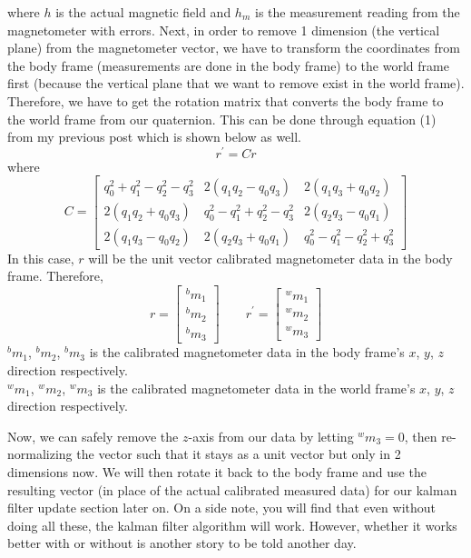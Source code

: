 \documentclass[a4paper,12pt]{book}
\begin{document}
where $h$ is the actual magnetic field and $h_m$ is the measurement reading from the magnetometer with errors. Next, in order to remove 1 dimension (the vertical plane) from the magnetometer vector, we have to transform the coordinates from the body frame (measurements are done in the body frame) to the world frame first (because the vertical plane that we want to remove exist in the world frame). Therefore, we have to get the rotation matrix that converts the body frame to the world frame from our quaternion. This can be done through equation (1) from my previous post which is shown below as well.
\begin{equation}
    r^\prime=Cr
\end{equation}
where
\begin{equation}
    C=\begin{bmatrix} q_0^2+q_1^2-q_2^2-q_3^2 & 2(q_1q_2-q_0q_3) & 2(q_1q_3+q_0q_2) \\ 2(q_1q_2+q_0q_3) & q_0^2-q_1^2+q_2^2-q_3^2 & 2(q_2q_3-q_0q_1) \\ 2(q_1q_3-q_0q_2) & 2(q_2q_3+q_0q_1) & q_0^2-q_1^2-q_2^2+q_3^2 \end{bmatrix}
\end{equation}
In this case, $r$ will be the unit vector calibrated magnetometer data in the body frame. Therefore,
\begin{equation}
   r = \begin{bmatrix} ^bm_1 \\ ^bm_2 \\ ^bm_3 \end{bmatrix} \qquad r^\prime = \begin{bmatrix} ^wm_1 \\ ^wm_2 \\ ^wm_3 \end{bmatrix}
\end{equation}
$^bm_1$, $^bm_2$, $^bm_3$  is the calibrated magnetometer data in the body frame’s $x$, $y$, $z$ direction respectively.\\

$^wm_1$, $^wm_2$, $^wm_3$ is the calibrated magnetometer data in the world frame’s $x$, $y$, $z$ direction respectively.

Now, we can safely remove the $z$-axis from our data by letting $^wm_3=0$, then re-normalizing the vector such that it stays as a unit vector but only in 2 dimensions now. We will then rotate it back to the body frame and use the resulting vector (in place of the actual calibrated measured data) for our kalman filter update section later on. On a side note, you will find that even without doing all these, the kalman filter algorithm will work. However, whether it works better with or without is another story to be told another day.
\end{document}
